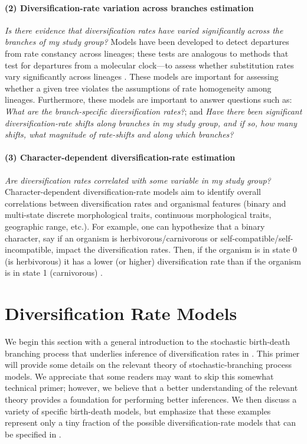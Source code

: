 \paragraph{(2) Diversification-rate variation across branches estimation}\textit{Is there evidence that diversification rates have varied significantly across the branches of my study group?}
Models have been developed to detect departures from rate constancy across lineages; these tests are analogous to methods that test for departures from a molecular clock---\IE to assess whether substitution rates vary significantly across lineages \citep{Alfaro2009,Rabosky2014a}.
These models are important for assessing whether a given tree violates the assumptions of rate homogeneity among lineages.
Furthermore, these models are important to answer questions such as:
\textit{What are the branch-specific diversification rates?}; and
\textit{Have there been significant diversification-rate shifts along branches in my study group, and if so, how many shifts, what magnitude of rate-shifts and along which branches?}


\paragraph{(3) Character-dependent diversification-rate estimation}\textit{Are diversification rates correlated with some variable in my study group?}
Character-dependent diversification-rate models aim to identify overall correlations between diversification rates and organismal features (binary and multi-state discrete morphological traits, continuous morphological traits, geographic range, etc.).
For example, one can hypothesize that a binary character, say if an organism is herbivorous/carnivorous or self-compatible/self-incompatible, impact the diversification rates.
Then, if the organism is in state 0 (\EG is herbivorous) it has a lower (or higher) diversification rate than if the organism is in state 1 (\EG carnivorous) \citep{Maddison2007}.


\section{Diversification Rate Models} \label{sec:models}

We begin this section with a general introduction to the stochastic birth-death branching process that underlies inference of diversification rates in \RevBayes.
This primer will provide some details on the relevant theory of stochastic-branching process models.
We appreciate that some readers may want to skip this somewhat technical primer; however, we believe that a better understanding of the relevant theory provides a foundation for performing better inferences.
We then discuss a variety of specific birth-death models, but emphasize that these examples represent only a tiny fraction of the possible diversification-rate models that can be specified in \RevBayes.

